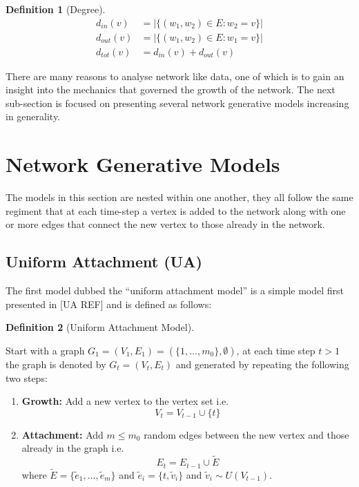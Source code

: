 \documentclass[
  10pt,
  a4paper,
]{scrreprt}
\providecommand{\tightlist}{%
  \setlength{\itemsep}{0pt}\setlength{\parskip}{0pt}}\usepackage{longtable,booktabs,array}
\theoremstyle{definition}
\newtheorem{definition}{Definition}[section]
\theoremstyle{plain}
\theoremstyle{remark}
\begin{document}
{\begin{definition}[Degree]
\begin{align*}
d_{in}(v)&= |\{(w_1,w_2)\in E: w_2=v \}|\\
d_{out}(v) &= |\{(w_1,w_2)\in E: w_1=v \}|\\
d_{tot}(v) &= d_{in}(v) + d_{out}(v)
\end{align*}

\end{definition}

There are many reasons to analyse network like data, one of which is to
gain an insight into the mechanics that governed the growth of the
network. The next sub-section is focused on presenting several network
generative models increasing in generality.

\hypertarget{network-generative-models}{%
\section{Network Generative Models}\label{network-generative-models}}

The models in this section are nested within one another, they all
follow the same regiment that at each time-step a vertex is added to the
network along with one or more edges that connect the new vertex to
those already in the network.

\hypertarget{uniform-attachment-ua}{%
\subsection{Uniform Attachment (UA)}\label{uniform-attachment-ua}}

The first model dubbed the ``uniform attachment model'' is a simple
model first presented in {[}UA REF{]} and is defined as follows:

\begin{definition}[Uniform Attachment
Model]\protect\hypertarget{def-ua}{}\label{def-ua}

Start with a graph \(G_1 = (V_1, E_1) = (\{1,\ldots,m_0\}, \emptyset)\),
at each time step \(t>1\) the graph is denoted by \(G_t=(V_t, E_t)\) and
generated by repeating the following two steps:

\begin{enumerate}
\def\labelenumi{\arabic{enumi}.}
\tightlist
\item
  \textbf{Growth:} Add a new vertex to the vertex set i.e.~ \[
  V_t=V_{t-1}\cup\{t\}
  \]
\item
  \textbf{Attachment:} Add \(m\le m_0\) random edges between the new
  vertex and those already in the graph i.e.~ \[
  E_t = E_{t-1} \cup \tilde E
  \] where \(\tilde E = \{\tilde e_1,\ldots, \tilde e_m\}\) and
  \(\tilde e_i = \{t,\tilde v_i\}\) and \(\tilde v_i \sim U(V_{t-1})\).
\end{enumerate}


\end{definition}}
\end{document}
